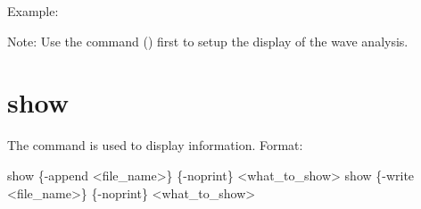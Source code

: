 {{{{Example:

Note: Use the  command () first to setup the display of the wave analysis.


\section{show}
\label{s:show}

The  command is used to display information.
Format:
\begin{example}
  show \{-append <file_name>\} \{-noprint\} <what_to_show>
  show \{-write <file_name>\} \{-noprint\} <what_to_show>
\end{example}

}}}}
